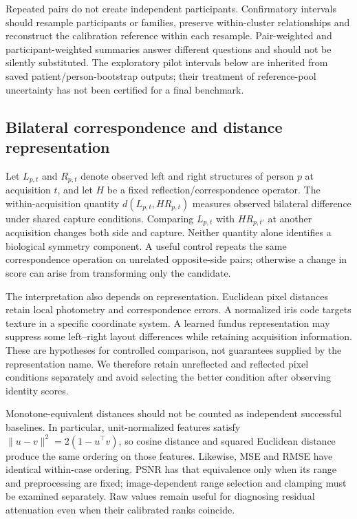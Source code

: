 \documentclass[10pt,twocolumn,letterpaper]{article}
\begin{document}
Repeated pairs do not create independent participants. Confirmatory intervals should resample participants or families, preserve within-cluster relationships and reconstruct the calibration reference within each resample. Pair-weighted and participant-weighted summaries answer different questions and should not be silently substituted. The exploratory pilot intervals below are inherited from saved patient/person-bootstrap outputs; their treatment of reference-pool uncertainty has not been certified for a final benchmark.

\subsection{Bilateral correspondence and distance representation}
\label{sec:bilateral}
Let $L_{p,t}$ and $R_{p,t}$ denote observed left and right structures of person $p$ at acquisition $t$, and let $H$ be a fixed reflection/correspondence operator. The within-acquisition quantity $d(L_{p,t},HR_{p,t})$ measures observed bilateral difference under shared capture conditions. Comparing $L_{p,t}$ with $HR_{p,t'}$ at another acquisition changes both side and capture. Neither quantity alone identifies a biological symmetry component. A useful control repeats the same correspondence operation on unrelated opposite-side pairs; otherwise a change in score can arise from transforming only the candidate.

The interpretation also depends on representation. Euclidean pixel distances retain local photometry and correspondence errors. A normalized iris code targets texture in a specific coordinate system. A learned fundus representation may suppress some left--right layout differences while retaining acquisition information. These are hypotheses for controlled comparison, not guarantees supplied by the representation name. We therefore retain unreflected and reflected pixel conditions separately and avoid selecting the better condition after observing identity scores.

Monotone-equivalent distances should not be counted as independent successful baselines. In particular, unit-normalized features satisfy $\|u-v\|^2=2(1-u^\top v)$, so cosine distance and squared Euclidean distance produce the same ordering on those features. Likewise, MSE and RMSE have identical within-case ordering. PSNR has that equivalence only when its range and preprocessing are fixed; image-dependent range selection and clamping must be examined separately. Raw values remain useful for diagnosing residual attenuation even when their calibrated ranks coincide.
\end{document}
